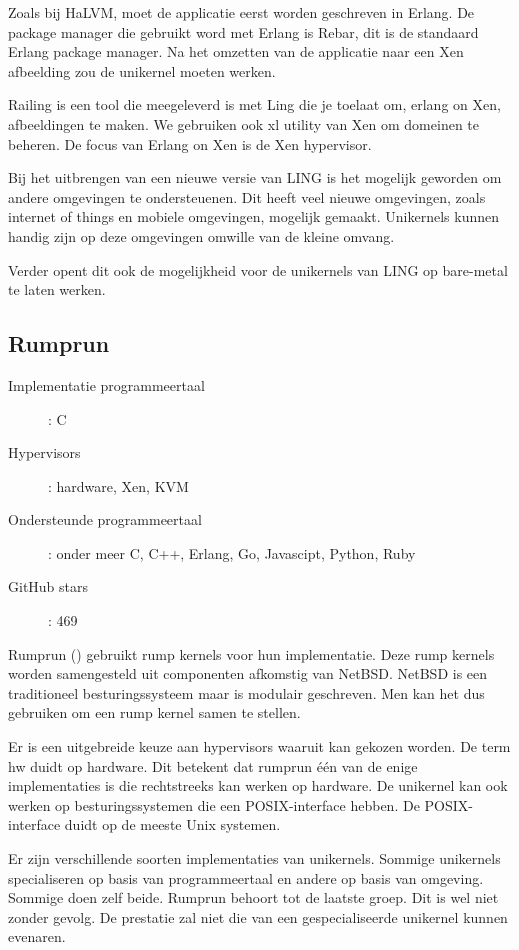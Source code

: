 Zoals bij HaLVM, moet de applicatie eerst worden geschreven in Erlang. De package manager die gebruikt word met Erlang is Rebar, dit is de standaard Erlang package manager. Na het omzetten van de applicatie naar een Xen afbeelding zou de unikernel moeten werken.

Railing is een tool die meegeleverd is met Ling die je toelaat om, erlang on Xen, afbeeldingen te maken. We gebruiken ook xl utility van Xen om domeinen te beheren.
De focus van Erlang on Xen is de Xen hypervisor. 

Bij het uitbrengen van een nieuwe versie van LING is het mogelijk geworden om andere omgevingen te ondersteuenen. Dit heeft veel nieuwe omgevingen, zoals internet of things en mobiele omgevingen, mogelijk gemaakt.
Unikernels kunnen handig zijn op deze omgevingen omwille van de kleine omvang. 

Verder opent dit ook de mogelijkheid voor de unikernels van LING op bare-metal te laten werken.

\subsection{Rumprun}

\begin{description}
  \item [Implementatie programmeertaal]: C
  \item [Hypervisors]: hardware, Xen, KVM
  \item [Ondersteunde programmeertaal]: onder meer C, C++, Erlang, Go, Javascipt, Python, Ruby
  \item [GitHub stars]: 469
\end{description}

Rumprun  (\cite{_rumpkernel/rumprun_????}) gebruikt rump kernels voor hun implementatie. Deze rump kernels worden samengesteld uit componenten afkomstig van NetBSD. NetBSD is een traditioneel besturingssysteem maar is modulair geschreven. Men kan het dus gebruiken om een rump kernel samen te stellen.

Er is een uitgebreide keuze aan hypervisors waaruit kan gekozen worden. De term hw duidt op hardware. Dit betekent dat rumprun één van de enige implementaties is die rechtstreeks kan werken op hardware. De unikernel kan ook werken op besturingssystemen die een POSIX-interface hebben. De POSIX-interface duidt op de meeste Unix systemen.

Er zijn verschillende soorten implementaties van unikernels. Sommige unikernels specialiseren op basis van programmeertaal en andere op basis van omgeving. Sommige doen zelf beide. Rumprun behoort tot de laatste groep. Dit is wel niet zonder gevolg. De prestatie zal niet die van een gespecialiseerde unikernel kunnen evenaren.

